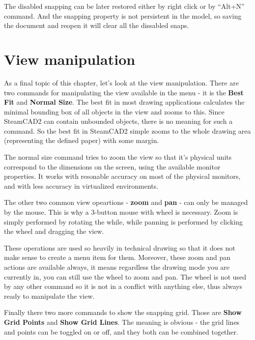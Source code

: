 The disabled snapping can be later restored either by right click or by ``Alt+N'' command.
And the snapping property is not persistent in the model, so saving the document and reopen
it will clear all the dissabled snaps.

\section{View manipulation}

As a final topic of this chapter, let's look at the view manipulation. There are two commands
for manipulating the view available in the menu - it is the \textbf{Best Fit} and
\textbf{Normal Size}. The best fit in most drawing applications calculates the minimal bounding
box of all objects in the view and zooms to this. Since SteamCAD2 can contain unbounded objects,
there is no meaning for such a command. So the best fit in SteamCAD2 simple zooms to the whole
drawing area (representing the defined paper) with some margin.

The normal size command tries to zoom the view so that it's physical units correspond to the
dimensions on the screen, using the available monitor properties. It works with resonable
accuracy on most of the physical monitors, and with less accuracy in virtualized environments.

The other two common view opeartions - \textbf{zoom} and \textbf{pan} - can only be managed
by the mouse. This is why a 3-button mouse with wheel is necessary. Zoom is simply performed
by rotating the while, while panning is performed by clicking the wheel and dragging the view.

These operations are used so heavily in technical drawing so that it does not make sense
to create a menu item for them. Moreover, these zoom and pan actions are available always,
it means regardless the drawing mode you are currently in, you can still use the wheel
to zoom and pan. The wheel is not used by any other command so it is not in a conflict
with anything else, thus always ready to manipulate the view.

Finally there two more commands to show the snapping grid. Those are \textbf{Show Grid Points}
and \textbf{Show Grid Lines}. The meaning is obvious - the grid lines and points can be toggled
on or off, and they both can be combined together.
